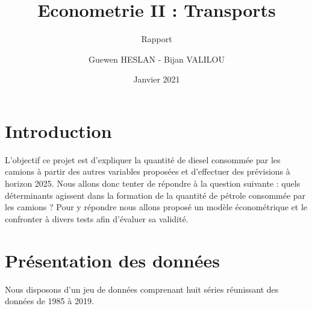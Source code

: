 \documentclass[
]{article}
\title{Econometrie II : Transports}
\subtitle{Rapport}
\author{Guewen HESLAN - Bijan VALILOU}
\date{Janvier 2021}
\begin{document}
\maketitle

\tableofcontents
\newpage

\hypertarget{introduction}{%
\section{Introduction}\label{introduction}}

L'objectif ce projet est d'expliquer la quantité de diesel consommée par
les camions à partir des autres variables proposées et d'effectuer des
prévisions à horizon 2025. Nous allons donc tenter de répondre à la
question suivante : quels déterminants agissent dans la formation de la
quantité de pétrole consommée par les camions ? Pour y répondre nous
allons proposé un modèle économétrique et le confronter à divers tests
afin d'évaluer sa validité.

\hypertarget{pruxe9sentation-des-donnuxe9es}{%
\section{Présentation des
données}\label{pruxe9sentation-des-donnuxe9es}}

Nous disposons d'un jeu de données comprenant huit séries réunissant des
données de 1985 à 2019.
\end{document}

